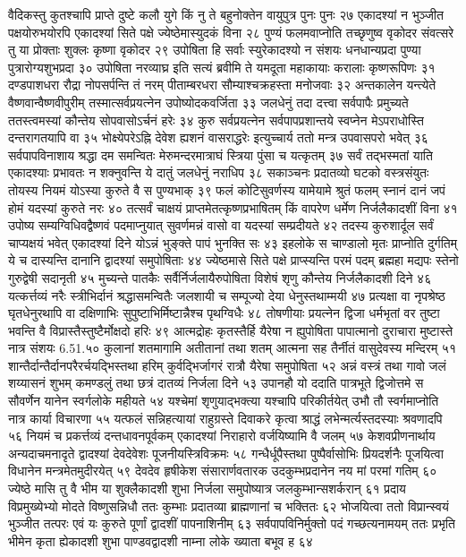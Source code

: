 वैदिकस्तु कुतश्चापि प्राप्ते दुष्टे कलौ युगे 
किं नु ते बहुनोक्तेन वायुपुत्र पुनः पुनः २७
एकादश्यां न भुञ्जीत पक्षयोरुभयोरपि 
एकादश्यां सिते पक्षे ज्येष्ठेमास्युदकं विना २८
पुण्यं फलमवाप्नोति तच्छृणुष्व वृकोदर 
संवत्सरे तु या प्रोक्ताः शुक्लः कृष्णा वृकोदर २९
उपोषिता हि सर्वाः स्युरेकादश्यो न संशयः 
धनधान्यप्रदा पुण्या पुत्रारोग्यशुभप्रदा ३०
उपोषिता नरव्याघ्र इति सत्यं ब्रवीमि ते 
यमदूता महाकायाः करालाः कृष्णरूपिणः ३१
दण्डपाशधरा रौद्रा नोपसर्पन्ति तं नरम् 
पीताम्बरधरा सौम्याश्चक्रहस्ता मनोजवाः ३२
अन्तकालेन यन्त्येते वैष्णवान्वैष्णवीपुरीम् 
तस्मात्सर्वप्रयत्नेन उपोष्योदकवर्जिता ३३
जलधेनुं तदा दत्त्वा सर्वपापैः प्रमुच्यते 
ततस्त्वमस्यां कौन्तेय सोपवासोऽर्चनं हरेः ३४
कुरु सर्वप्रयत्नेन सर्वपापप्रशान्तये 
स्वप्नेन मेऽपराधोस्ति दन्तरागतयापि वा ३५
भोक्ष्येपरेऽह्नि देवेश ह्यशनं वासराद्धरेः 
इत्युच्चार्य ततो मन्त्र उपवासपरो भवेत् ३६
सर्वपापविनाशाय श्रद्धा दम समन्वितः 
मेरुमन्दरमात्राघं स्त्रिया पुंसा च यत्कृतम् ३७
सर्वं तद्भस्मतां याति एकादश्याः प्रभावतः 
न शक्नुवन्ति ये दातुं जलधेनुं नराधिप ३८
सकाञ्चनः प्रदातव्यो घटको वस्त्रसंयुतः 
तोयस्य नियमं योऽस्या कुरुते वै स पुण्यभाक् ३९
फलं कोटिसुवर्णस्य यामेयामे श्रुतं फलम् 
स्नानं दानं जपं होमं यदस्यां कुरुते नरः ४०
तत्सर्वं चाक्षयं प्राप्तमेतत्कृष्णप्रभाषितम् 
किं वापरेण धर्मेण निर्जलैकादशीं विना ४१
उपोष्य सम्यग्विधिवद्वैष्णवं पदमाप्नुयात् 
सुवर्णमन्नं वासो वा यदस्यां सम्प्रदीयते ४२
तदस्य कुरुशार्दूल सर्वं चाप्यक्षयं भवेत् 
एकादश्यां दिने योऽन्नं भुङ्क्ते पापं भुनक्ति सः ४३
इहलोके स चाण्डालो मृतः प्राप्नोति दुर्गतिम् 
ये च दास्यन्ति दानानि द्वादश्यां समुपोषिताः ४४
ज्येष्ठमासे सिते पक्षे प्राप्स्यन्ति परमं पदम् 
ब्रह्महा मद्यपः स्तेनो गुरुद्वेषी सदानृती ४५
मुच्यन्ते पातकैः सर्वैर्निर्जलायैरुपोषिता 
विशेषं शृणु कौन्तेय निर्जलैकादशी दिने ४६
यत्कर्त्तव्यं नरैः स्त्रीभिर्दानं श्रद्धासमन्वितैः 
जलशायी च सम्पूज्यो देया धेनुस्तथाम्मयी ४७
प्रत्यक्षा वा नृपश्रेष्ठ घृतधेनुरथापि वा 
दक्षिणाभिः सुपुष्टाभिर्मिष्टान्नैश्च पृथग्विधैः ४८
तोषणीयाः प्रयत्नेन द्विजा धर्मभृतां वर 
तुष्टा भवन्ति वै विप्रास्तैस्तुष्टैर्मोक्षदो हरिः ४९
आत्मद्रोहः कृतस्तैर्हि यैरेषा न ह्युपोषिता 
पापात्मानो दुराचारा मुष्टास्ते नात्र संशयः 6.51.५०
कुलानां शतमागामि अतीतानां तथा शतम् 
आत्मना सह तैर्नीतं वासुदेवस्य मन्दिरम् ५१
शान्तैर्दान्तैर्दानपरैरर्चयद्भिस्तथा हरिम् 
कुर्वद्भिर्जागरं रात्रौ यैरेषा समुपोषिता ५२
अन्नं वस्त्रं तथा गावो जलं शय्यासनं शुभम् 
कमण्डलुं तथा छत्रं दातव्यं निर्जला दिने ५३
उपानहौ यो ददाति पात्रभूते द्विजोत्तमे 
स सौवर्णेन यानेन स्वर्गलोके महीयते ५४
यश्चेमां शृणुयाद्भक्त्या यश्चापि परिकीर्तयेत् 
उभौ तौ स्वर्गमाप्नोति नात्र कार्या विचारणा ५५
यत्फलं सन्निहत्यायां राहुग्रस्ते दिवाकरे 
कृत्वा श्राद्धं लभेन्मर्त्यस्तदस्याः श्रवणादपि ५६
नियमं च प्रकर्त्तव्यं दन्तधावनपूर्वकम् 
एकादश्यां निराहारो वर्जयिष्यामि वै जलम् ५७
केशवप्रीणनार्थाय अन्यदाचमनादृते 
द्वादश्यां देवदेवेशः पूजनीयस्त्रिविक्रमः ५८
गन्धैर्धूपैस्तथा पुष्पैर्वासोभिः प्रियदर्शनैः 
पूजयित्वा विधानेन मन्त्रमेतमुदीरयेत् ५९
देवदेव हृषीकेश संसारार्णवतारक 
उदकुम्भप्रदानेन नय मां परमां गतिम् ६०
ज्येष्ठे मासि तु वै भीम या शुक्लैकादशी शुभा 
निर्जला समुपोष्यात्र जलकुम्भान्सशर्करान् ६१
प्रदाय विप्रमुख्येभ्यो मोदते विष्णुसन्निधौ 
ततः कुम्भाः प्रदातव्या ब्राह्मणानां  च भक्तितः ६२
भोजयित्वा ततो विप्रान्स्वयं भुञ्जीत तत्परः 
एवं यः कुरुते पूर्णां द्वादशीं पापनाशिनीम् ६३
सर्वपापविनिर्मुक्तो पदं गच्छत्यनामयम् 
ततः प्रभृति भीमेन कृता ह्येकादशी शुभा 
पाण्डवद्वादशी नाम्ना लोके ख्याता बभूव ह ६४

